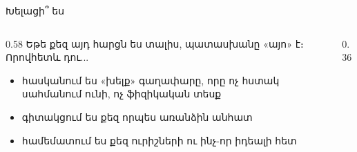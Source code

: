 
\begin{frame}{Խելացի՞ ես}
  \begin{columns}[c]
    \begin{column}{0.58\textwidth}
      Եթե քեզ այդ հարցն ես տալիս, պատասխանը «այո» է։ Որովհետև դու...
      \begin{itemize}
        \item<2-> հասկանում ես «խելք» գաղափարը, որը ոչ հստակ սահմանում ունի, ոչ ֆիզիկական տեսք
        \item<3-> գիտակցում ես քեզ որպես առանձին անհատ
        \item<4-> համեմատում ես քեզ ուրիշների ու ինչ-որ իդեալի հետ
      \end{itemize}
    \end{column}
    \begin{column}{0.36\textwidth}
      \centering
      \par\smallskip
    \end{column}
  \end{columns}
\end{frame}

